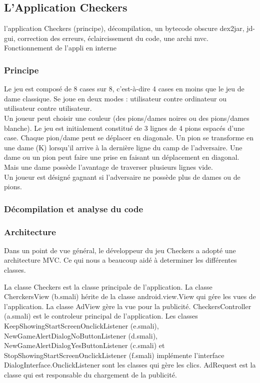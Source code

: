 
\subsection{L'Application Checkers}

l'application Checkers (principe), décompilation, un bytecode obscure
dex2jar, jd-gui, correction des erreurs, éclaircissement du code, une archi mvc.
Fonctionnement de l'appli en interne
\subsubsection{Principe}
\begin{figure}[hp]
	      \begin{center}
	      \end{center}
\end{figure}
Le jeu est composé de 8 cases sur 8, c’est-à-dire 4 cases en moins que le jeu de dame classique.  Se joue en deux modes : utilisateur contre ordinateur ou utilisateur contre utilisateur.\\
Un joueur peut choisir une couleur (des pions/dames noires ou des pions/dames blanche).  Le jeu est initialement constitué de 3 lignes de 4 pions espacés d’une case. Chaque pion/dame peut se déplacer en diagonale. 
Un pion se transforme en une dame (K) lorsqu’il arrive à la dernière ligne du camp de l’adversaire. Une dame ou un pion peut faire une prise en faisant un déplacement en diagonal. Mais une dame possède l’avantage de traverser plusieurs lignes vide.\\
Un joueur est désigné gagnant si l’adversaire ne possède plus de dames ou de pions. 
\subsubsection{Décompilation et analyse du code}

\newpage
\subsubsection{Architecture}
Dans un point de vue général, le développeur du jeu Checkers a adopté une architecture MVC. Ce qui nous a beaucoup aidé à determiner les différentes 
classes. 
\begin{figure}[hp]
	      \begin{center}
	      \end{center}
\end{figure}
La classe Checkers est la classe principale de l’application.
La classe CherckersView (b.smali) hérite de la classe android.view.View qui gére les vues de l’application. La classe AdView gère la vue pour la publicité.
CheckersController (a.smali) est le controleur principal de l’application. Les classes KeepShowingStartScreenOnclickListener (e.smali), NewGameAlertDialogNoButtonListener (d.smali), NewGameAlertDialogYesButtonListener (c.smali) et StopShowingStartScreenOnclickListener (f.smali) implémente l'interface DialogInterface.OnclickListener sont les classes qui gère les clics.
AdRequest est la classe qui est responsable du chargement de la publicité.
